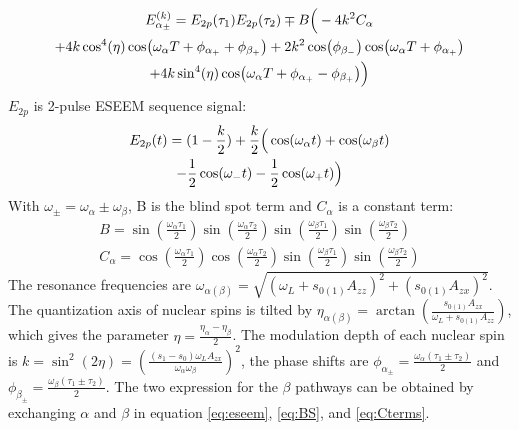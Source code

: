 \documentclass[%
 reprint,
superscriptaddress,
 amsmath,amssymb,
 aps,
]{revtex4-2}
\begin{document}
\small   
\begin{gather} 
	E_{\alpha_\pm}^{(k)} = E_{2p}(\tau_1) E_{2p}(\tau_2) \mp B \Big(-4k^2C_\alpha \notag \\
	+4k\cos^4(\eta) \cos(\omega_\alpha T + \phi_{\alpha_+} +\phi_{\beta_+}) 
	+2 k^2 \cos(\phi_{\beta_-}) \cos(\omega_\alpha T+\phi_{\alpha_+}) \notag \\
	+ 4k \sin^4(\eta) \cos(\omega_\alpha T +\phi_{\alpha_+} -\phi_{\beta_+} )\Big)
	\label{eq:eseem}
\end{gather}
\normalsize
$ E_{2p} $ is 2-pulse ESEEM sequence signal:
\begin{gather}
	E_{2p}(t)  = (1 - \frac{k}{2}) + \frac{k}{2} \Big(\cos(\omega_\alpha t)+\cos(\omega_\beta t) \notag \\
	-\frac{1}{2} \cos(\omega_{-}t)  -\frac{1}{2} \cos(\omega_{+}t)   \Big)
\end{gather}
With $\omega_{\pm} = \omega_\alpha \pm \omega_\beta$,  B is the blind spot term and $C_\alpha$ is a constant term:
\begin{gather}
	B = \sin(\frac{\omega_\alpha \tau_1}{2}) \sin(\frac{\omega_\alpha \tau_2}{2}) \sin(\frac{\omega_\beta \tau_1}{2}) \sin(\frac{\omega_\beta \tau_2}{2})
	\label{eq:BS}\\
	C_\alpha =\cos(\frac{\omega_\alpha \tau_1}{2}) \cos(\frac{\omega_\alpha \tau_2}{2}) \sin(\frac{\omega_\beta \tau_1}{2}) \sin(\frac{\omega_\beta \tau_2}{2}) \label{eq:Cterms}
\end{gather}
The resonance frequencies are $\omega_{\alpha(\beta)} = \sqrt{(\omega_L +s_{0(1)} A_{zz} )^2 +(s_{0(1)} A_{zx})^2}$. The quantization axis of nuclear spins is tilted by $\eta_{\alpha(\beta)} = \arctan(\frac{s_{0(1)}A_{zx}}{\omega_L+ s_{0(1)}A_{zz}})$, which gives the parameter $\eta=\frac{\eta_\alpha - \eta_\beta}{2}$. The modulation depth of each nuclear spin is $k=\sin^2(2\eta)=(\frac{(s_1-s_0)\omega_L A_{zx}}{\omega_\alpha \omega_\beta})^2$, the phase shifts are $\phi_{\alpha_\pm} = \frac{\omega_\alpha (\tau_1 \pm \tau_2)}{2}$ and $\phi_{\beta_\pm} = \frac{\omega_\beta (\tau_1 \pm \tau_2)}{2}$. The two expression for the $\beta$ pathways can be obtained by exchanging $\alpha$ and $\beta$ in equation \ref{eq:eseem}, \ref{eq:BS}, and \ref{eq:Cterms}.\\
\end{document}
